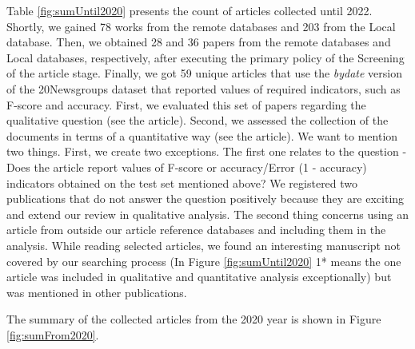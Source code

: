 \documentclass[
]{article}
\begin{document}
Table \ref{fig:sumUntil2020} presents the count of articles collected until 2022. Shortly, we gained 78 works from the remote databases and 203 from the Local database. Then, we obtained 28 and 36 papers from the remote databases and Local databases, respectively, after executing the primary policy of the Screening of the article stage. Finally, we got 59 unique articles that use the \emph{bydate} version of the 20Newsgroups dataset that reported values of required indicators, such as F-score and accuracy. First, we evaluated this set of papers regarding the qualitative question (see the article). Second, we assessed the collection of the documents in terms of a quantitative way (see the article). We want to mention two things. First, we create two exceptions. The first one relates to the question - Does the article report values of F-score or accuracy/Error (1 - accuracy) indicators obtained on the test set mentioned above? We registered two publications that do not answer the question positively because they are exciting and extend our review in qualitative analysis. The second thing concerns using an article from outside our article reference databases and including them in the analysis. While reading selected articles, we found an interesting manuscript not covered by our searching process (In Figure \ref{fig:sumUntil2020} 1* means the one article was included in qualitative and quantitative analysis exceptionally) but was mentioned in other publications.

The summary of the collected articles from the 2020 year is shown in Figure \ref{fig:sumFrom2020}.
\end{document}

